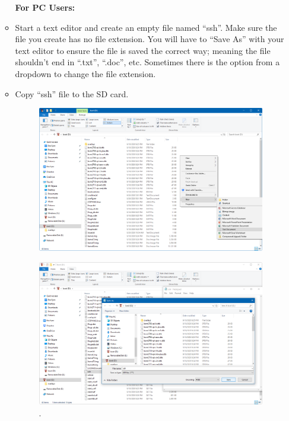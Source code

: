 \documentclass{article}
\begin{document}
\begin{enumerate}
\begin{itemize}
\begin{itemize}
\end{itemize}

\noindent \textbf{For PC Users:} 

  \item Start a text editor and create an empty file named ``ssh''. Make sure the file you create has no file extension. You will have to ``Save As'' with your text editor to ensure the file is saved the correct way; meaning the file shouldn't end in ``.txt'', ``.doc'', etc. Sometimes there is the option from a dropdown to change the file extension.
  
\item Copy ``ssh'' file to the SD card. 
\begin{figure}
  \includegraphics[width=1.00\textwidth]{sdbootnew}
\end{figure}


\begin{figure}
  \includegraphics[width=1.00\textwidth]{sdbootaf}
  \caption{.}
  \label{fig:sdbootf}
\end{figure}


\end{itemize}
\end{enumerate}
\end{document}
